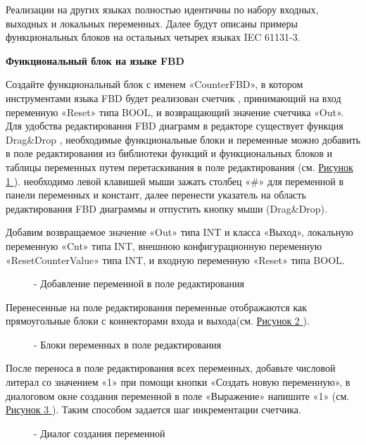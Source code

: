 \documentclass[letterpaper,10pt,russian]{sphinxmanual}
\begin{document}
Реализации на других языках полностью идентичны по набору входных,
выходных и локальных переменных. Далее будут описаны примеры
функциональных блоков на остальных четырех языках IEC 61131-3.

\textbf{Функциональный блок на языке FBD}

Создайте функциональный блок с именем «CounterFBD», в котором
инструментами языка FBD будет реализован счетчик , принимающий на вход
переменную «Reset» типа BOOL, и возвращающий значение счетчика «Out».
Для удобства редактирования FBD диаграмм в редакторе существует функция
Drag\&Drop , необходимые функциональные блоки и
переменные можно добавить в поле редактирования из библиотеки функций и
функциональных блоков и таблицы переменных путем
перетаскивания в поле редактирования (см. \hyperref[usage_guide/work_with_project:image163]{Рисунок \ref{usage_guide/work_with_project:image163} }). необходимо левой
клавишей мыши зажать столбец «\#» для переменной в панели переменных и
констант, далее перенести указатель на область редактирования FBD
диаграммы и отпустить кнопку мыши (Drag\&Drop).

Добавим возвращаемое значение «Out» типа INT и класса «Выход», локальную
переменную «Cnt» типа INT, внешнюю конфигурационную переменную
«ResetCounterValue» типа INT, и входную переменную «Reset» типа BOOL.
\begin{figure}[htbp]
\centering
\capstart

\noindent{}
\caption{- Добавление переменной в поле редактирования}\label{usage_guide/work_with_project:image163}\end{figure}

Перенесенные на поле редактирования переменные отображаются как
прямоугольные блоки с коннекторами входа и выхода(см. \hyperref[usage_guide/work_with_project:image164]{Рисунок \ref{usage_guide/work_with_project:image164} }).
\begin{figure}[htbp]
\centering
\capstart

\noindent{}
\caption{- Блоки переменных в поле редактирования}\label{usage_guide/work_with_project:image164}\end{figure}

После переноса в поле редактирования всех переменных, добавьте числовой
литерал со значением «1» при помощи кнопки «Создать новую
переменную», в диалоговом окне создания переменной в поле «Выражение»
напишите «1» (см. \hyperref[usage_guide/work_with_project:image165-2]{Рисунок \ref{usage_guide/work_with_project:image165-2} }). Таким способом задается шаг инкрементации
счетчика.
\begin{figure}[htbp]
\centering
\capstart

\noindent{}
\caption{- Диалог создания переменной}\label{usage_guide/work_with_project:image165-2}\end{figure}
\end{document}
